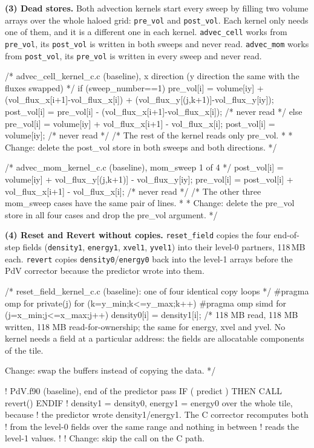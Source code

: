 \documentclass[a4paper,11pt]{article}
\newcommand{\kernel}[1]{\texttt{#1}}
\begin{document}
\textbf{(3) Dead stores.}
Both advection kernels start every sweep by filling two volume arrays over the whole haloed grid: \texttt{pre\_vol} and \texttt{post\_vol}.
Each kernel only needs one of them, and it is a different one in each kernel.
\kernel{advec\_cell} works from \texttt{pre\_vol}, its \texttt{post\_vol} is written in both sweeps and never read.
\kernel{advec\_mom} works from \texttt{post\_vol}, its \texttt{pre\_vol} is written in every sweep and never read.
\begin{code}
/* advec_cell_kernel_c.c (baseline), x direction (y direction the same with the fluxes swapped) */
if (sweep_number==1) {
  pre_vol[i]  = volume[iy] + (vol_flux_x[i+1]-vol_flux_x[i]) + (vol_flux_y[(j,k+1)]-vol_flux_y[iy]);
  post_vol[i] = pre_vol[i] - (vol_flux_x[i+1]-vol_flux_x[i]);   /* never read */
} else {
  pre_vol[i]  = volume[iy] + vol_flux_x[i+1] - vol_flux_x[i];
  post_vol[i] = volume[iy];                                      /* never read */
}
/* The rest of the kernel reads only pre_vol.
 *
 * Change: delete the post_vol store in both sweeps and both directions. */
\end{code}
\begin{code}
/* advec_mom_kernel_c.c (baseline), mom_sweep 1 of 4 */
post_vol[i] = volume[iy] + vol_flux_y[(j,k+1)] - vol_flux_y[iy];
pre_vol[i]  = post_vol[i] + vol_flux_x[i+1] - vol_flux_x[i];    /* never read */
/* The other three mom_sweep cases have the same pair of lines.
 *
 * Change: delete the pre_vol store in all four cases and drop the pre_vol argument. */
\end{code}

\textbf{(4) Reset and Revert without copies.}
\kernel{reset\_field} copies the four end-of-step fields (\texttt{density1}, \texttt{energy1},
\texttt{xvel1}, \texttt{yvel1}) into their level-0 partners, 118\,MB each.
\kernel{revert} copies \texttt{density0}/\texttt{energy0} back into the level-1 arrays before the PdV corrector because the predictor wrote into them.
\begin{code}
/* reset_field_kernel_c.c (baseline): one of four identical copy loops */
#pragma omp for private(j)
for (k=y_min;k<=y_max;k++)
#pragma omp simd
  for (j=x_min;j<=x_max;j++)
    density0[i] = density1[i];  /* 118 MB read, 118 MB written, 118 MB read-for-ownership;
                                   the same for energy, xvel and yvel. No kernel needs a
                                   field at a particular address: the fields are
                                   allocatable components of the tile.

                                   Change: swap the buffers instead of copying the data. */
\end{code}
\begin{code}[language={[90]Fortran}]
! PdV.f90 (baseline), end of the predictor pass
IF ( predict ) THEN
  CALL revert()
ENDIF
! density1 = density0, energy1 = energy0 over the whole tile, because
! the predictor wrote density1/energy1. The C corrector recomputes both
! from the level-0 fields over the same range and nothing in between
! reads the level-1 values.
!
! Change: skip the call on the C path.
\end{code}
\end{document}
